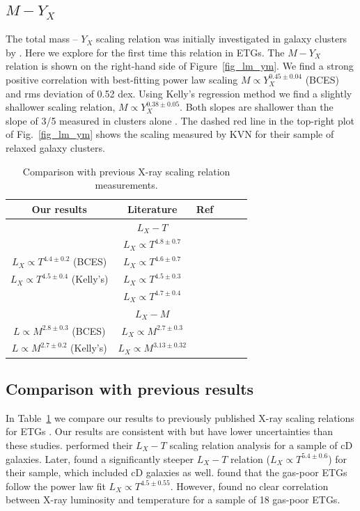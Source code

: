 \documentclass[iop]{emulateapj}
\begin{document}
\subsection{$M-Y_X$}
The total mass -- $Y_X$ scaling relation was initially investigated in galaxy clusters by \citet{Kravtsov:06}. Here we explore for the first time this relation in ETGs. The $M-Y_X$ relation is shown on the right-hand side of Figure~\ref{fig_lm_ym}. We find a strong positive correlation with best-fitting power law scaling $M \propto Y_X^{0.45\pm0.04}$ (BCES) and rms deviation of 0.52 dex. Using Kelly's regression method we find a slightly shallower scaling relation, $M \propto Y_X^{0.38\pm0.05}$.  Both slopes are shallower than the slope of 3/5 measured in clusters alone \citep[][referred to as KVN]{Kravtsov:06}. The dashed red line in the top-right plot of Fig.~\ref{fig_lm_ym} shows the scaling measured by KVN for their sample of relaxed galaxy clusters.

\begin{table}
\centering
\caption{Comparison with previous X-ray scaling relation measurements.}\label{tab_comp_scal}
\begin{tabular}{cccccc}
\hline
Our results & Literature & Ref \\
\hline
 & $L_X-T$ & \\
\hline
 & $L_X \propto T^{4.8\pm0.7}$ & \citet{OSullivan_sample:03} \\
$L_X \propto T^{4.4\pm0.2}$ (BCES) & $L_X \propto T^{4.6\pm0.7}$ & \citet{Boroson:10} \\
$L_X \propto T^{4.5\pm0.4}$ (Kelly's) & $L_X \propto T^{4.5\pm0.3}$ & \citet{Kim:15} \\
 & $L_X \propto T^{4.7\pm0.4}$ & \citet{Goulding:16} \\
 \hline
 & $L_X-M$ & \\
\hline
$L \propto M^{2.8\pm0.3}$ (BCES) & $L_X \propto M^{2.7\pm0.3}$ & \citet{Kim:13} \\
$L \propto M^{2.7\pm0.2}$ (Kelly's) & $L_X \propto M^{3.13\pm0.32}$ & \citet{Forbes:16} \\
\hline
\end{tabular}

\end{table}

\subsection{Comparison with previous results}

In Table~\ref{tab_comp_scal} we compare our results to previously published X-ray scaling relations for ETGs \citep{OSullivan_sample:03, Boroson:10, Kim:13, Kim:15, Goulding:16, Forbes:16}. Our results are consistent with but have lower uncertainties than these studies. \citet{OSullivan_sample:03} performed their $L_X-T$ scaling relation analysis for a sample of cD galaxies. Later, \citet{Kim:15} found a significantly steeper $L_X-T$ relation ($L_X \propto T^{5.4\pm0.6}$) for their sample, which included cD galaxies as well. \citet{Boroson:10} found that the gas-poor ETGs follow the power law fit $L_X \propto T^{4.5\pm0.55}$. However, \citet{David:06} found no clear correlation between X-ray luminosity and temperature for a sample of 18 gas-poor ETGs. 
\end{document}
